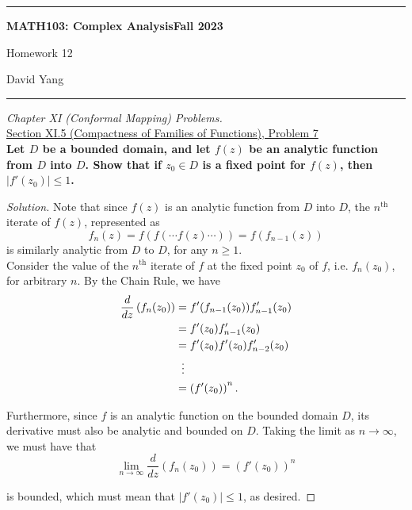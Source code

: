 \documentclass[11pt]{article}
\newenvironment{solution}
  {\renewcommand\qedsymbol{$\blacksquare$}\begin{proof}[Solution]}
  {\end{proof}}
\theoremstyle{definition}
\begin{document}
	\hrule
	\begin{center}
        \textbf{MATH103: Complex Analysis}\hfill \textbf{Fall 2023}\newline


		{\Large Homework 12}

		David Yang
	\end{center}

\hrule

\vspace{1em}


\textit{Chapter XI (Conformal Mapping) Problems.} \\

\underline{Section XI.5 (Compactness of Families of Functions), Problem 7}\\

\textbf{Let $D$ be a bounded domain, and let $f(z)$ be an analytic function from $D$ into $D$. Show that if $z_0 \in D$ is a fixed point for $f(z)$, then $|f'(z_0)| \leq 1$.}

\begin{solution}
Note that since $f(z)$ is an analytic function from $D$ into $D$, the $n^{\text{th}}$ iterate of $f(z)$, represented as \[f_n(z) = f(f(\cdots f(z) \cdots)) = f(f_{n-1}(z)) \] is similarly analytic from $D$ to $D$, for any $n \geq 1$. \\

Consider the value of the $n^{\text{th}}$ iterate of $f$ at the fixed point $z_0$ of $f$, i.e. $f_n(z_0)$, for arbitrary $n$. By the Chain Rule, we have 
\begin{align*}\frac{d}{dz}\left(f_n(z_0)\right) &= f'(f_{n-1}(z_0))f_{n-1}'(z_0) \\
	&= f'(z_0)f_{n-1}'(z_0)\\
	&= f'(z_0)f'(z_0)f_{n-2}'(z_0) \\
	& \hspace{0.2cm}\vdots \\
	&= \left(f'(z_0)\right)^n.
\end{align*}

Furthermore, since $f$ is an analytic function on the bounded domain $D$, its derivative must also be analytic and bounded on $D$. Taking the limit as $n \rightarrow \infty$, we must have that
\[ \lim\limits_{n \rightarrow \infty}\frac{d}{dz}\left(f_n(z_0)\right) = \left(f'(z_0)\right)^n\]

is bounded, which must mean that $|f'(z_0)| \leq 1$, as desired.
\end{solution}
\end{document}
